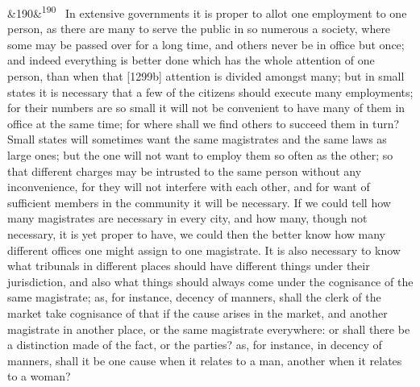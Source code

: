 \documentclass[12pt]{article}
\newcommand{\para}[1][]{\par\noindent\ifx&#1&\else\textsuperscript{\footnotesize #1}~\fi}
\begin{document}
\para[190] In extensive governments it is proper to allot one employment to one person, as there are many to serve the public in so numerous a society, where some may be passed over for a long time, and others never be in office but once; and indeed everything is better done which has the whole attention of one person, than when that [1299b] attention is divided amongst many; but in small states it is necessary that a few of the citizens should execute many employments; for their numbers are so small it will not be convenient to have many of them in office at the same time; for where shall we find others to succeed them in turn? Small states will sometimes want the same magistrates and the same laws as large ones; but the one will not want to employ them so often as the other; so that different charges may be intrusted to the same person without any inconvenience, for they will not interfere with each other, and for want of sufficient members in the community it will be necessary. If we could tell how many magistrates are necessary in every city, and how many, though not necessary, it is yet proper to have, we could then the better know how many different offices one might assign to one magistrate. It is also necessary to know what tribunals in different places should have different things under their jurisdiction, and also what things should always come under the cognisance of the same magistrate; as, for instance, decency of manners, shall the clerk of the market take cognisance of that if the cause arises in the market, and another magistrate in another place, or the same magistrate everywhere: or shall there be a distinction made of the fact, or the parties? as, for instance, in decency of manners, shall it be one cause when it relates to a man, another when it relates to a woman?
\end{document}
